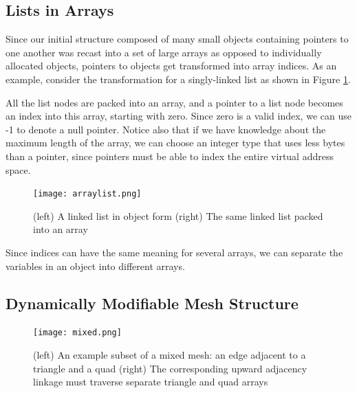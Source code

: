 \subsection{Lists in Arrays}
\label{sec:lia}

Since our initial structure composed of many small objects containing pointers
to one another was recast into a set of large arrays
as opposed to individually allocated objects,
pointers to objects get transformed into array indices.
As an example, consider the transformation for a singly-linked
list as shown in Figure \ref{fig:arraylist}.

All the list nodes are packed into an array, and a pointer to
a list node becomes an index into this array, starting with zero.
Since zero is a valid index, we can use -1 to denote a null pointer.
Notice also that if we have knowledge about the maximum length
of the array, we can choose an integer type that uses less bytes
than a pointer, since pointers must be able to index the entire
virtual address space.

\begin{figure}
\begin{center}
\texttt{[image: arraylist.png]}
\caption{(left) A linked list in object form
(right) The same linked list packed into an array}
\label{fig:arraylist}
\end{center}
\end{figure}

Since indices can have the same meaning for several arrays,
we can separate the variables in an object into different
arrays.

\subsection{Dynamically Modifiable Mesh Structure}
\label{sec:sisc_mstruct}

\begin{figure}
\begin{center}
\texttt{[image: mixed.png]}
\caption{(left) An example subset of a mixed mesh:
an edge adjacent to a triangle and a quad
(right) The corresponding upward adjacency linkage
must traverse separate triangle and quad arrays}
\label{fig:mixed}
\end{center}
\end{figure}

